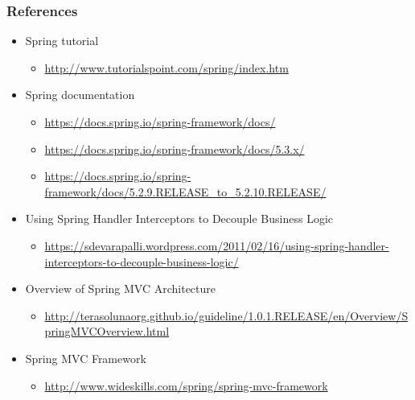 \documentclass[10pt,xcolor=pdflatex, table]{beamer}
\begin{document}
\begin{frame}\frametitle{References}
	\begin{itemize}
		\item Spring tutorial
          \begin{itemize}
        	\item \url{http://www.tutorialspoint.com/spring/index.htm}
          \end{itemize}
		\item Spring documentation
          \begin{itemize}
            \item \url{https://docs.spring.io/spring-framework/docs/}
        	\item \url{https://docs.spring.io/spring-framework/docs/5.3.x/}
        	\item \url{https://docs.spring.io/spring-framework/docs/5.2.9.RELEASE_to_5.2.10.RELEASE/}
          \end{itemize}
		\item Using Spring Handler Interceptors to Decouple Business Logic
          \begin{itemize}
        	\item {\footnotesize\url{https://sdevarapalli.wordpress.com/2011/02/16/using-spring-handler-interceptors-to-decouple-business-logic/}}
          \end{itemize}
		\item Overview of Spring MVC Architecture
          \begin{itemize}
        	\item \url{http://terasolunaorg.github.io/guideline/1.0.1.RELEASE/en/Overview/SpringMVCOverview.html}
          \end{itemize}
        \item Spring MVC Framework
          \begin{itemize}
        	\item \url{http://www.wideskills.com/spring/spring-mvc-framework}
          \end{itemize}
	\end{itemize}
\end{frame}
\end{document}
